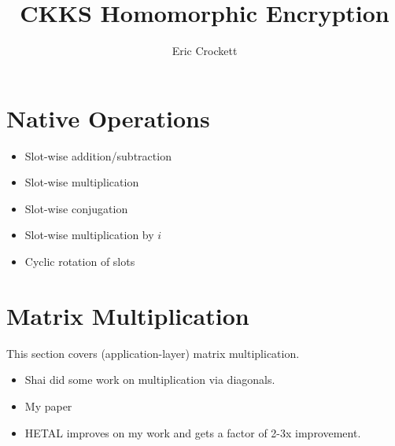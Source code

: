 \documentclass[../fheimpl.tex]{subfiles}
\title{CKKS Homomorphic Encryption}
\author{Eric Crockett}
\begin{document}
\ifcompileasbook
\else
\maketitle
\listoffixmes
\fi

\section{Native Operations}
    \begin{itemize}
        \item Slot-wise addition/subtraction
        \item Slot-wise multiplication
        \item Slot-wise conjugation
        \item Slot-wise multiplication by $i$
        \item Cyclic rotation of slots		
    \end{itemize}


\section{Matrix Multiplication}
This section covers (application-layer) matrix multiplication.

\begin{itemize}
    \item Shai did some work on multiplication via diagonals.
    \item \cite{cryptoeprint:2020/1483} My paper
    \item HETAL \cite{10.5555/3618408.3619194} improves on my work and gets a factor of 2-3x improvement.
\end{itemize}

    \ifcompileasbook
    \else
    \printbibliography
    \fi
	
\end{document}
